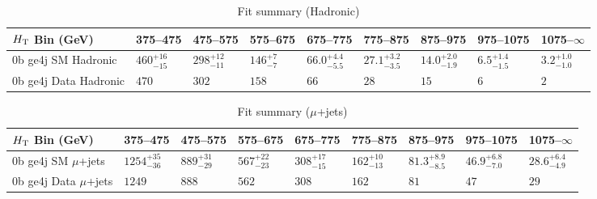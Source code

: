 \documentclass[8pt]{article}
\def\scalht{\mbox{$H_{\rm{T}}$}\xspace}
\newcommand\T{\rule{0pt}{2.6ex}}
\begin{document}
\begin{table}[ht!]
\caption{Fit summary (Hadronic)}
\label{tab:ensemble-summary}
\centering
\begin{tabular}{ lllllllll }

\hline
\scalht Bin (GeV)       & 375--475                       & 475--575                       & 575--675                       & 675--775                       & 775--875                       & 875--975                       & 975--1075                      & 1075--$\infty$                 \\ [1.000000ex]
\hline
0b ge4j SM Hadronic\T   & $460^{+16}_{-15}$              & $298^{+12}_{-11}$              & $146^{+7}_{-7}$                & $66.0^{+4.4}_{-5.5}$           & $27.1^{+3.2}_{-3.5}$           & $14.0^{+2.0}_{-1.9}$           & $6.5^{+1.4}_{-1.5}$            & $3.2^{+1.0}_{-1.0}$            \\ 
0b ge4j Data Hadronic\T & $470$                          & $302$                          & $158$                          & $66$                           & $28$                           & $15$                           & $6$                            & $2$                            \\ 
\hline

\end{tabular}
\end{table}
\begin{table}[ht!]
\caption{Fit summary ($\mu$+jets)}
\label{tab:ensemble-summary}
\centering
\begin{tabular}{ lllllllll }

\hline
\scalht Bin (GeV)       & 375--475                       & 475--575                       & 575--675                       & 675--775                       & 775--875                       & 875--975                       & 975--1075                      & 1075--$\infty$                 \\ [1.000000ex]
\hline
0b ge4j SM $\mu$+jets\T & $1254^{+35}_{-36}$             & $889^{+31}_{-29}$              & $567^{+22}_{-23}$              & $308^{+17}_{-15}$              & $162^{+10}_{-13}$              & $81.3^{+8.9}_{-8.5}$           & $46.9^{+6.8}_{-7.0}$           & $28.6^{+6.4}_{-4.9}$           \\ 
0b ge4j Data $\mu$+jets\T & $1249$                         & $888$                          & $562$                          & $308$                          & $162$                          & $81$                           & $47$                           & $29$                           \\ 
\hline

\end{tabular}
\end{table}
\end{document}
